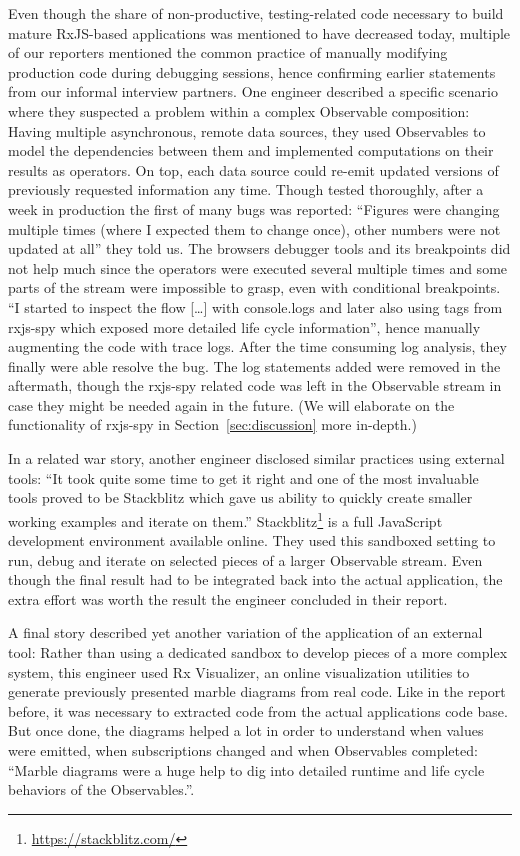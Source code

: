 \documentclass[12pt,a4paper]{article}
\begin{document}
Even though the share of non-productive, testing-related code necessary to build mature RxJS-based applications was mentioned to have decreased today, multiple of our reporters mentioned the common practice of manually modifying production code during debugging sessions, hence confirming earlier statements from our informal interview partners. One engineer described a specific scenario where they suspected a problem within a complex Observable composition: Having multiple asynchronous, remote data sources, they used Observables to model the dependencies between them and implemented computations on their results as operators. On top, each data source could re-emit updated versions of previously requested information any time. Though tested thoroughly, after a week in production the first of many bugs was reported: ``Figures were changing multiple times (where I expected them to change once), other numbers were not updated at all'' they told us. The browsers debugger tools and its breakpoints did not help much since the operators were executed several multiple times and some parts of the stream were impossible to grasp, even with conditional breakpoints. ``I started to inspect the flow [\dots] with console.logs and later also using tags from rxjs-spy which exposed more detailed life cycle information'', hence manually augmenting the code with trace logs. After the time consuming log analysis, they finally were able resolve the bug. The log statements added were removed in the aftermath, though the rxjs-spy related code was left in the Observable stream in case they might be needed again in the future. (We will elaborate on the functionality of rxjs-spy in Section~\ref{sec:discussion} more in-depth.)

In a related war story, another engineer disclosed similar practices using  external tools: ``It took quite some time to get it right and one of the most invaluable tools proved to be Stackblitz which gave us ability to quickly create smaller working examples and iterate on them.'' Stackblitz\footnote{\url{https://stackblitz.com/}} is a full JavaScript development environment available online. They used this sandboxed setting to run, debug and iterate on selected pieces of a larger Observable stream. Even though the final result had to be integrated back into the actual application, the extra effort was worth the result the engineer concluded in their report.

A final story described yet another variation of the application of an external tool: Rather than using a dedicated sandbox to develop pieces of a more complex system, this engineer used Rx Visualizer, an online visualization utilities to generate previously presented marble diagrams from real code. Like in the report before, it was necessary to extracted code from the actual applications code base. But once done, the diagrams helped a lot in order to understand when values were emitted, when subscriptions changed and when Observables completed: ``Marble diagrams were a huge help to dig into detailed runtime and life cycle behaviors of the Observables.''.
\end{document}
